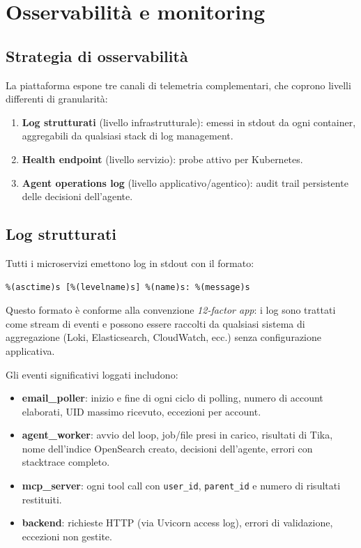 \chapter{Osservabilit\`a e monitoring}
\label{chap:observability}

\section{Strategia di osservabilit\`a}
\label{sec:observability_strategy}

La piattaforma espone tre canali di telemetria complementari, che coprono livelli
differenti di granularit\`a:

\begin{enumerate}[leftmargin=*]
    \item \textbf{Log strutturati} (livello infrastrutturale): emessi in stdout da ogni
          container, aggregabili da qualsiasi stack di log management.
    \item \textbf{Health endpoint} (livello servizio): probe attivo per Kubernetes.
    \item \textbf{Agent operations log} (livello applicativo/agentico): audit trail
          persistente delle decisioni dell'agente.
\end{enumerate}

\section{Log strutturati}
\label{sec:logging}

Tutti i microservizi emettono log in stdout con il formato:
\begin{verbatim}
%(asctime)s [%(levelname)s] %(name)s: %(message)s
\end{verbatim}

Questo formato \`e conforme alla convenzione \emph{12-factor app}: i log sono trattati
come stream di eventi e possono essere raccolti da qualsiasi sistema di aggregazione
(Loki, Elasticsearch, CloudWatch, ecc.) senza configurazione applicativa.

Gli eventi significativi loggati includono:

\begin{itemize}[leftmargin=*]
    \item \textbf{email\_poller}: inizio e fine di ogni ciclo di polling, numero di
          account elaborati, UID massimo ricevuto, eccezioni per account.
    \item \textbf{agent\_worker}: avvio del loop, job/file presi in carico, risultati
          di Tika, nome dell'indice OpenSearch creato, decisioni dell'agente,
          errori con stacktrace completo.
    \item \textbf{mcp\_server}: ogni tool call con \texttt{user\_id}, \texttt{parent\_id}
          e numero di risultati restituiti.
    \item \textbf{backend}: richieste HTTP (via Uvicorn access log), errori di
          validazione, eccezioni non gestite.
\end{itemize}

